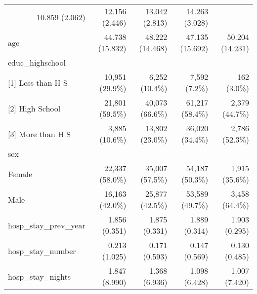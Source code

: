 \begin{table}[!h]
\begin{tabular}{lllll}
  \multicolumn{1}{r}{10.859 (2.062)} &
  \multicolumn{1}{r}{12.156 (2.446)} &
  \multicolumn{1}{r}{13.042 (2.813)} &
  \multicolumn{1}{r}{14.263 (3.028)} \\
\multicolumn{1}{l}{age} &
  \multicolumn{1}{r}{44.738 (15.832)} &
  \multicolumn{1}{r}{48.222 (14.468)} &
  \multicolumn{1}{r}{47.135 (15.692)} &
  \multicolumn{1}{r}{50.204 (14.231)} \\
\multicolumn{1}{l}{educ\_highschool} &
  \multicolumn{1}{r}{} &
  \multicolumn{1}{r}{} &
  \multicolumn{1}{r}{} &
  \multicolumn{1}{r}{} \\
\multicolumn{1}{l}{\hspace{1em}[1] Less than H S} &
  \multicolumn{1}{r}{10,951 (29.9\%)} &
  \multicolumn{1}{r}{6,252 (10.4\%)} &
  \multicolumn{1}{r}{7,592 (7.2\%)} &
  \multicolumn{1}{r}{162 (3.0\%)} \\
\multicolumn{1}{l}{\hspace{1em}[2] High School} &
  \multicolumn{1}{r}{21,801 (59.5\%)} &
  \multicolumn{1}{r}{40,073 (66.6\%)} &
  \multicolumn{1}{r}{61,217 (58.4\%)} &
  \multicolumn{1}{r}{2,379 (44.7\%)} \\
\multicolumn{1}{l}{\hspace{1em}[3] More than H S} &
  \multicolumn{1}{r}{3,885 (10.6\%)} &
  \multicolumn{1}{r}{13,802 (23.0\%)} &
  \multicolumn{1}{r}{36,020 (34.4\%)} &
  \multicolumn{1}{r}{2,786 (52.3\%)} \\
\multicolumn{1}{l}{sex} &
  \multicolumn{1}{r}{} &
  \multicolumn{1}{r}{} &
  \multicolumn{1}{r}{} &
  \multicolumn{1}{r}{} \\
\multicolumn{1}{l}{\hspace{1em}Female} &
  \multicolumn{1}{r}{22,337 (58.0\%)} &
  \multicolumn{1}{r}{35,007 (57.5\%)} &
  \multicolumn{1}{r}{54,187 (50.3\%)} &
  \multicolumn{1}{r}{1,915 (35.6\%)} \\
\multicolumn{1}{l}{\hspace{1em}Male} &
  \multicolumn{1}{r}{16,163 (42.0\%)} &
  \multicolumn{1}{r}{25,877 (42.5\%)} &
  \multicolumn{1}{r}{53,589 (49.7\%)} &
  \multicolumn{1}{r}{3,458 (64.4\%)} \\
\multicolumn{1}{l}{hosp\_stay\_prev\_year} &
  \multicolumn{1}{r}{1.856 (0.351)} &
  \multicolumn{1}{r}{1.875 (0.331)} &
  \multicolumn{1}{r}{1.889 (0.314)} &
  \multicolumn{1}{r}{1.903 (0.295)} \\
\multicolumn{1}{l}{hosp\_stay\_number} &
  \multicolumn{1}{r}{0.213 (1.025)} &
  \multicolumn{1}{r}{0.171 (0.593)} &
  \multicolumn{1}{r}{0.147 (0.569)} &
  \multicolumn{1}{r}{0.130 (0.485)} \\
\multicolumn{1}{l}{hosp\_stay\_nights} &
  \multicolumn{1}{r}{1.847 (8.990)} &
  \multicolumn{1}{r}{1.368 (6.936)} &
  \multicolumn{1}{r}{1.098 (6.428)} &
  \multicolumn{1}{r}{1.007 (7.420)} \\
\cline{1-5}
\end{tabular}
\end{table}
